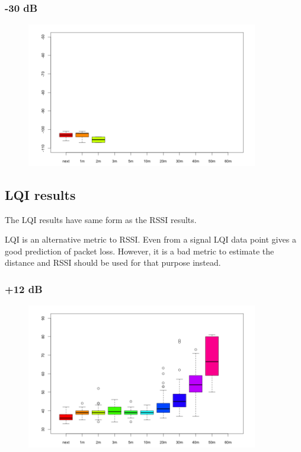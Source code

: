 \subsubsection{-30 dB}

\begin{figure}[H]
  \centering
  \includegraphics[width=0.9\textwidth]{img/tests/rssi/db_m30.png}
\end{figure}

\subsection{LQI results}
The LQI results have same form as the RSSI results.

LQI is an alternative metric to RSSI.
Even from a signal LQI data point gives a good prediction of packet loss.
However, it is a bad metric to estimate the distance and RSSI should be used for that purpose instead.


\subsubsection{+12 dB}

\begin{figure}[H]
  \centering
  \includegraphics[width=0.9\textwidth]{img/tests/lqi/db_12.png}
\end{figure}


